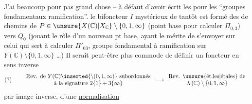 J'ai beaucoup  pour pas grand chose -- à défaut d'avoir écrit les    pour les ``groupes fondamentaux  ramification''.  le bifoncteur $I$ mystérieux de tantôt est formé des  de chemins de $P\in\unsure{X(\mathbb C)|X_{\mathbb C}}\setminus\{0,1,\infty\}$ (point base pour calculer $\Pi_{0,3}$) vers $Q_0$ (jouant le rôle d'un nouveau pt base, ayant le mérite de s'envoyer sur celui  qui sert à calculer $\Pi'_{03}$, groupe fondamental à ramification sur $Y(\mathbb C)\setminus\{0,1,\infty\}$ \dots) Il serait peut-être plus commode de définir  un foncteur en sens inverse
\[
(7)\qquad
\begin{array}{c}
\text{Rev. de }Y(\mathbb C)\inserted{\setminus(0,1,\infty)}\ \text{subordonnés}\\
\text{à la signature }2\{1\}+3\{\infty\}
\end{array}
\longrightarrow
\begin{array}{c}
\text{Rev. \unsure{ét.les|étales} de}\\
X(\mathbb C)\setminus\{0,1,\infty\}
\end{array}
\]
par image inverse,  d'une \uline{normalisation}
